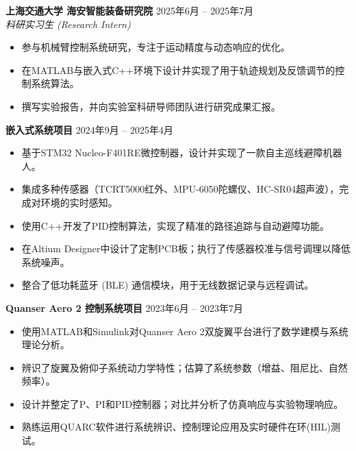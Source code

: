 \documentclass[11pt, a4paper]{article}
\newcommand{\entry}[2]{\textbf{#1} \hfill #2}
\begin{document}
\vspace{4pt}
\entry{上海交通大学 海安智能装备研究院}{2025年6月 -- 2025年7月} \\
\textit{科研实习生 (Research Intern)}
\begin{itemize}[leftmargin=*, nosep, topsep=2pt]
    \item 参与机械臂控制系统研究，专注于运动精度与动态响应的优化。
    \item 在MATLAB与嵌入式C++环境下设计并实现了用于轨迹规划及反馈调节的控制系统算法。
    \item 撰写实验报告，并向实验室科研导师团队进行研究成果汇报。
\end{itemize}

\vspace{4pt}
\entry{嵌入式系统项目}{2024年9月 -- 2025年4月}
\begin{itemize}[leftmargin=*, nosep, topsep=2pt]
    \item 基于STM32 Nucleo-F401RE微控制器，设计并实现了一款自主巡线避障机器人。
    \item 集成多种传感器（TCRT5000红外、MPU-6050陀螺仪、HC-SR04超声波），完成对环境的实时感知。
    \item 使用C++开发了PID控制算法，实现了精准的路径追踪与自动避障功能。
    \item 在Altium Designer中设计了定制PCB板；执行了传感器校准与信号调理以降低系统噪声。
    \item 整合了低功耗蓝牙 (BLE) 通信模块，用于无线数据记录与远程调试。
\end{itemize}

\vspace{4pt}
\entry{Quanser Aero 2 控制系统项目}{2023年6月 -- 2023年7月}
\begin{itemize}[leftmargin=*, nosep, topsep=2pt]
    \item 使用MATLAB和Simulink对Quanser Aero 2双旋翼平台进行了数学建模与系统理论分析。
    \item 辨识了旋翼及俯仰子系统动力学特性；估算了系统参数（增益、阻尼比、自然频率）。
    \item 设计并整定了P、PI和PID控制器；对比并分析了仿真响应与实验物理响应。
    \item 熟练运用QUARC软件进行系统辨识、控制理论应用及实时硬件在环(HIL)测试。
\end{itemize}

\end{document}
